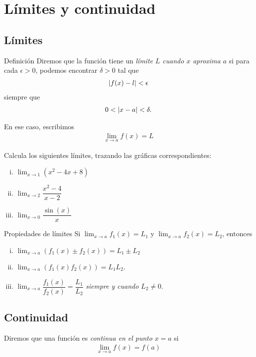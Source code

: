 \section{Límites y continuidad}

\subsection{Límites}
{Definición}
 Diremos que la función tiene un \emph{límite $L$ cuando $x$ aproxima $a$} si para cada $\epsilon >0$, podemos encontrar $\delta >0$ tal que 
 \begin{align*}
  \left|f(x)-l\right| < \epsilon
  \end{align*}
siempre que 
\begin{align*}
 0 < \left|x-a\right| < \delta.
 \end{align*}

{}
  En ese caso, escribimos
  \begin{align*}
   \lim_{x \to a} f(x) = L
   \end{align*}

{}
  \begin{problema}
   Calcula los siguientes límites, trazando las gráficas correspondientes:
   \begin{enumerate}[(i)]
     \item $\lim_{x\to 1}\left( x^{2}-4x+8 \right)$      
     \item $\lim_{x\to 2}\dfrac{x^{2}-4}{x-2}$      
     \item $\lim_{x\to 0}\dfrac{\sin(x)}{x}$ 
\end{enumerate}
  \end{problema}


{Propiedades de límites}
  Si $\lim_{x \to a}f_{1}(x)= L_{1}$ y $\lim_{x \to a }f_{2}(x)= L_{2}$, entonces
  \begin{enumerate}[(i)]
    \item $\lim_{x\to a}\left( f_{1}(x)\pm f_{2}(x) \right) = L_{1}\pm L_{2}$     
    \item $\lim_{x\to a}\left( f_{1}(x) f_{2}(x)\right)= L_{1}L_{2}$.    
    \item 
    $\lim_{x \to a}\dfrac{f_{1}(x)}{f_{2}(x)} = \dfrac{L_{1}}{L_{2}}$ 
    \emph{siempre y cuando $L_{2}\neq 0$}.
\end{enumerate}

\subsection{Continuidad}
{}
  Diremos que una función es \emph{continua en el punto $x=a$} si 
  \begin{align*}
   \lim_{x\to a} f(x)=f(a)
   \end{align*}

